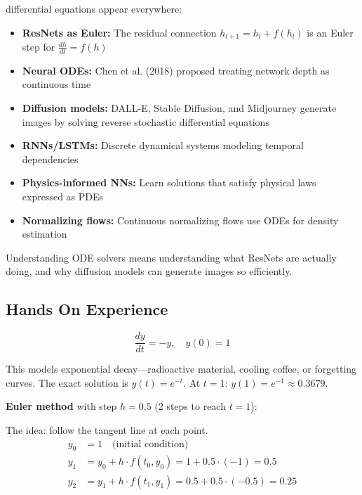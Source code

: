  differential equations appear everywhere:
\begin{itemize}
    \item \textbf{ResNets as Euler:} The residual connection $h_{l+1} = h_l + f(h_l)$ is an Euler step for $\frac{dh}{dt} = f(h)$
    \item \textbf{Neural ODEs:} Chen et al. (2018) proposed treating network depth as continuous time
    \item \textbf{Diffusion models:} DALL-E, Stable Diffusion, and Midjourney generate images by solving reverse stochastic differential equations
    \item \textbf{RNNs/LSTMs:} Discrete dynamical systems modeling temporal dependencies
    \item \textbf{Physics-informed NNs:} Learn solutions that satisfy physical laws expressed as PDEs
    \item \textbf{Normalizing flows:} Continuous normalizing flows use ODEs for density estimation
\end{itemize}

 Understanding ODE solvers means understanding what ResNets are actually doing, and why diffusion models can generate images so efficiently.



\newpage
\subsection{Hands On Experience}

\begin{equation}
    \frac{dy}{dt} = -y, \quad y(0) = 1
\end{equation}

This models exponential decay---radioactive material, cooling coffee, or forgetting curves. The exact solution is $y(t) = e^{-t}$. At $t = 1$: $y(1) = e^{-1} \approx 0.3679$.

\vspace{1em}
\textbf{Euler method} with step $h = 0.5$ (2 steps to reach $t=1$):

The idea: follow the tangent line at each point.
\begin{align*}
    y_0 &= 1 \quad \text{(initial condition)} \\
    y_1 &= y_0 + h \cdot f(t_0, y_0) = 1 + 0.5 \cdot (-1) = 0.5 \\
    y_2 &= y_1 + h \cdot f(t_1, y_1) = 0.5 + 0.5 \cdot (-0.5) = 0.25
\end{align*}

